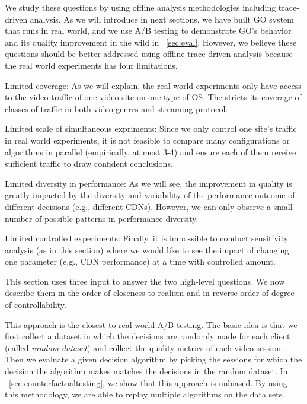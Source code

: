 We study these questions by using offline analysis methodologies including trace-driven analysis. As we will introduce in next sections, we have built GO system that runs in real world, and we use A/B testing  to demonstrate GO's behavior and its quality improvement in the wild in \Section~\ref{sec:eval}. However, we believe these questions should be better addressed using offline trace-driven analysis because the real world experiments has four limitations.
\begin{packedenumerate}
	\item Limited coverage: As we will explain, the real world experiments only have access to the video traffic of one video site on one type of OS. The stricts its coverage of classes of traffic in both video genres and streaming protocol.
	\item Limited scale of simultaneous expriments: Since we only control one site's traffic in real world experiments, it is not feasible to compare many configurations or algorithms in parallel (empirically, at most 3-4) and ensure each of them receive sufficient traffic to draw confident conclusions.
	\item Limited diversity in performance: As we will see, the improvement in quality is greatly impacted by the diversity and variability of the performance outcome of different decisions (e.g., different CDNs). However, we can only observe a small number of possible patterns in performance diversity.
	\item Limited controlled experiments: Finally, it is impossible to conduct sensitivity analysis (as in this section) where we would like to see the impact of changing one parameter (e.g., CDN performance) at a time with controlled amount.
\end{packedenumerate}


This section uses three input to answer the two high-level questions. We now describe them in the order of closeness to realism and in reverse order of degree of controllability.

 This approach is the closest to real-world A/B testing. The basic idea is that we first collect a dataset in which the decisions are randomly made for each client (called {\it random dataset}) and collect the quality metrics of each video session. Then we evaluate a given decision algorithm by picking the sessions for which the decision the algorithm makes matches the decisions in the random dataset. In \Section~\ref{sec:counterfactualtesting}, we show that this approach is unbiased. 
By using this methodology, we are able to replay multiple algorithms on the data sets.


